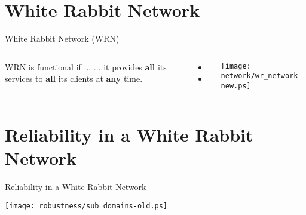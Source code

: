 \documentclass[compress, red]{beamer}
\begin{document}
\section{White Rabbit Network}
\begin{frame}{White Rabbit Network (WRN)}


\begin{columns}[c]

    \begin{block}{WRN is functional if ...}
    ... it provides {\bf all} its services to {\bf all} its clients at {\bf any} time.
    \end{block}

  \vspace{0.2cm}

  \begin{itemize}
    \item \color{blue!90}{Sub-nanosecond time synchronization}
    \item \color{red}{Deterministic Control Data delivery}
  \end{itemize}

    \begin{center}
    \texttt{[image: network/wr\_network-new.ps]}
    \end{center}
\end{columns}
  

\end{frame}
\section{Reliability in a White Rabbit Network}
\begin{frame}{Reliability in a White Rabbit Network}


    \begin{center}
    \texttt{[image: robustness/sub\_domains-old.ps]}
    \end{center}

  

\end{frame}
\end{document}
